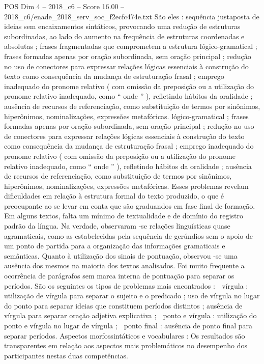 \begin{textsample}{POS Dim 4 – 2018\_c6 – Score 16.00 – 2018\_c6/enade\_2018\_serv\_soc\_f2ecfc474e.txt}
São eles : sequência justaposta de ideias sem encaixamentos sintáticos, provocando uma redução de estruturas subordinadas, ao lado do aumento na frequência de estruturas coordenadas e absolutas ; frases fragmentadas que comprometem a estrutura lógico-gramatical ; frases formadas apenas por oração subordinada, sem oração principal ; redução no uso de conectores para expressar relações lógicas essenciais à construção do texto como consequência da mudança de estruturação frasal ; emprego inadequado do pronome relativo ( com omissão da preposição ou a utilização do pronome relativo inadequado, como “ onde ” ), refletindo hábitos da oralidade ; ausência de recursos de referenciação, como substituição de termos por sinônimos, hiperônimos, nominalizações, expressões metafóricas. lógico-gramatical ; frases formadas apenas por oração subordinada, sem oração principal ; redução no uso de conectores para expressar relações lógicas essenciais à construção do texto como consequência da mudança de estruturação frasal ; emprego inadequado do pronome relativo ( com omissão da preposição ou a utilização do pronome relativo inadequado, como “ onde ” ), refletindo hábitos da oralidade ; ausência de recursos de referenciação, como substituição de termos por sinônimos, hiperônimos, nominalizações, expressões metafóricas.
Esses problemas revelam dificuldades em relação à estrutura formal do texto produzido, o que é preocupante ao se levar em conta que são graduandos em fase final de formação.
Em alguns textos, falta um mínimo de textualidade e de domínio do registro padrão da língua.
Na verdade, observaram -se relações linguísticas quase agramaticais, como as estabelecidas pela sequência de gerúndios sem o apoio de um ponto de partida para a organização das informações gramaticais e semânticas.
Quanto à utilização dos sinais de pontuação, observou -se uma ausência dos mesmos na maioria dos textos analisados.
Foi muito frequente a ocorrência de parágrafos sem marca interna de pontuação para separar os períodos.
São os seguintes os tipos de problemas mais encontrados :  vírgula : utilização de vírgula para separar o sujeito e o predicado ; uso de vírgula no lugar do ponto para separar ideias que constituem períodos distintos ; ausência de vírgula para separar oração adjetiva explicativa ;  ponto e vírgula : utilização do ponto e vírgula no lugar de vírgula ;  ponto final : ausência de ponto final para separar períodos.
Aspectos morfossintáticos e vocabulares : Os resultados são transparentes em relação aos aspectos mais problemáticos no desempenho dos participantes nestas duas competências.

\end{textsample}
